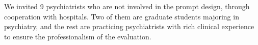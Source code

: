 We invited 9 psychiatrists who are not involved in the prompt design, through cooperation with hospitals. Two of them are graduate students majoring in psychiatry, and the rest are practicing psychiatrists with rich clinical experience to ensure the professionalism of the evaluation.









